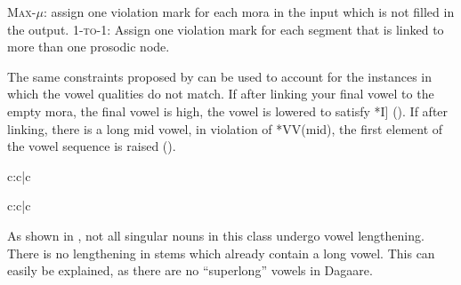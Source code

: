 \documentclass[output=paper,colorlinks,citecolor=brown,
]{langscibook}
\begin{document}
\ea \begin{xlist}
    \ex \textsc{Max}-$\mu$: assign one violation mark for each mora in the input which is not filled in the output. 
    \ex  \textsc{1-to-1}: Assign one violation mark for each segment  that is linked to more than one prosodic node.
    \end{xlist}
\z

The same constraints proposed by \cite{anttilaProsodic2009} can be used to account for the instances in which the vowel qualities do not match. If after linking your final vowel to the empty mora, the final vowel is high, the vowel is lowered to satisfy *I] (). If after linking, there is a long mid vowel, in violation of *VV(mid), the first element of the vowel sequence is raised ().

\begin{table}
  \caption{Tableau illustrating high vowel lowering in [nóbíé] `finger' in ND}
  \label{tab:Caragine:morafinger}
\begin{tableau}{c:c|c}
\const{*I]} 
 \vio{*!} \vio{*} \vio{} 
 \vio{} \vio{} \vio{}
 \vio{} \vio{*!} \vio{*}
\end{tableau}
\end{table}

\begin{table}
  \caption{Tableau illustrating mid vowel raising in [buo] `goat' in ND}
  \label{tab:Caragine:moragoat}
\begin{tableau}{c:c|c}
 \vio{*!} \vio{} \vio{} 
 \vio{} \vio{} \vio{}
 \vio{} \vio{*!} \vio{*}
\end{tableau}
\end{table}

As shown in , not all singular nouns in this class undergo vowel lengthening. There is no lengthening in stems which already contain a long vowel. This can easily be explained, as there are no ``superlong'' vowels in Dagaare. 
\end{document}
